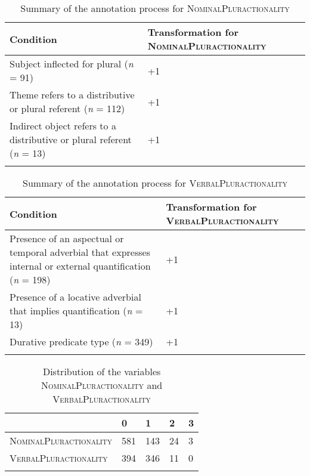 \documentclass[output=paper,colorlinks,citecolor=brown]{langscibook}
\begin{document}
\begin{table}[p]
\begin{tabularx}{\textwidth}{Qp{.35\textwidth}}
\lsptoprule
{Condition} & {Transformation} {for} \newline\textsc{NominalPluractionality} \\\midrule
Subject inflected for plural (\textit{n} = 91) &  +1\\
\tablevspace
Theme refers to a distributive or plural referent (\textit{n} = 112) &  +1\\
\tablevspace
Indirect object refers to a distributive or plural referent (\textit{n} = 13) &  +1\\
\lspbottomrule
\end{tabularx}
\caption{Summary of the annotation process for \textsc{NominalPluractionality}}
\label{tab:rb2}
\end{table}

\begin{table}[p]
\begin{tabularx}{\textwidth}{Qp{.35\textwidth}}
\lsptoprule
 {Condition} & {Transformation} {for} \newline\textsc{VerbalPluractionality}  \\\midrule
Presence of an aspectual or temporal adverbial that expresses internal or external quantification (\textit{n} = 198)  &  +1\\
\tablevspace
Presence of a locative adverbial that implies quantification (\textit{n} = 13)  &  +1\\
\tablevspace
Durative predicate type (\textit{n} = 349)  & +1 \\
\lspbottomrule
\end{tabularx}
\caption{Summary of the annotation process for \textsc{VerbalPluractionality}}
\label{tab:rb3}
\end{table}

\begin{table}[p]
\begin{tabularx}{\textwidth}{lYYYY}
\lsptoprule
 & 0 & 1 & 2 & 3\\
\midrule
\textsc{NominalPluractionality} & 581 & 143 & 24 & 3 \\
\textsc{VerbalPluractionality} & 394 & 346 & 11 & 0\\
\lspbottomrule
\end{tabularx}
\caption{Distribution of the variables \textsc{NominalPluractionality} and \textsc{VerbalPluractionality}}
\label{tab:rb4}
\end{table}
\end{document}
